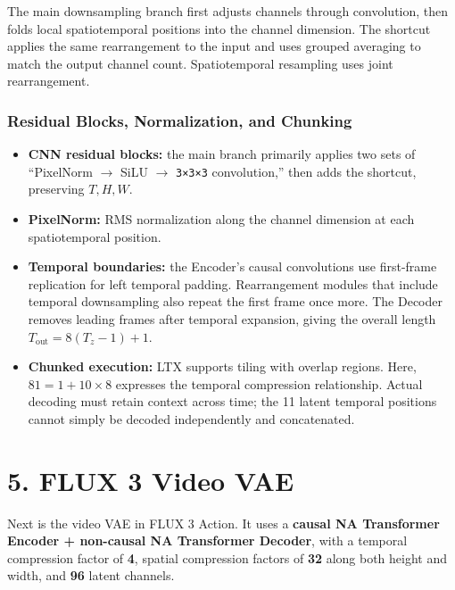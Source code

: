 \documentclass[
  11pt,
  a4paper,
]{article}
\providecommand{\tightlist}{%
  \setlength{\itemsep}{0pt}\setlength{\parskip}{0pt}}
\newcommand{\NotesFluxLayout}{%
  \clearpage
  \fancyhead[L]{\small\sffamily\color{notesgray}Video VAE / FLUX 3 Details}%
  \linespread{1.06}\selectfont
  \setlength{\parskip}{0.24em}%
  \setlength{\abovedisplayskip}{6pt plus 2pt minus 2pt}%
  \setlength{\belowdisplayskip}{6pt plus 2pt minus 2pt}%
  \setlength{\abovedisplayshortskip}{3pt plus 2pt}%
  \setlength{\belowdisplayshortskip}{3pt plus 2pt minus 2pt}%
}
\begin{document}
\endgroup

The main downsampling branch first adjusts channels through convolution,
then folds local spatiotemporal positions into the channel dimension.
The shortcut applies the same rearrangement to the input and uses
grouped averaging to match the output channel count. Spatiotemporal
resampling uses joint rearrangement.


\subsubsection{Residual Blocks, Normalization, and
Chunking}\label{residual-blocks-normalization-and-chunking}

\begin{itemize}
\tightlist
\item
  \textbf{CNN residual blocks:} the main branch primarily applies two
  sets of ``PixelNorm \(\rightarrow\) SiLU \(\rightarrow\)
  \texttt{3×3×3} convolution,'' then adds the shortcut, preserving
  \(T,H,W\).
\item
  \textbf{PixelNorm:} RMS normalization along the channel dimension at
  each spatiotemporal position.
\item
  \textbf{Temporal boundaries:} the Encoder's causal convolutions use
  first-frame replication for left temporal padding. Rearrangement
  modules that include temporal downsampling also repeat the first frame
  once more. The Decoder removes leading frames after temporal
  expansion, giving the overall length
  \textbf{\(T_{\mathrm{out}}=8(T_z-1)+1\)}.
\item
  \textbf{Chunked execution:} LTX supports tiling with overlap regions.
  Here, \textbf{\(81=1+10\times8\)} expresses the temporal compression
  relationship. Actual decoding must retain context across time; the 11
  latent temporal positions cannot simply be decoded independently and
  concatenated.
\end{itemize}

\NotesFluxLayout

\section{5. FLUX 3 Video VAE}\label{flux3}

Next is the video VAE in FLUX 3 Action. It uses a \textbf{causal NA
Transformer Encoder + non-causal NA Transformer Decoder}, with a
temporal compression factor of \textbf{4}, spatial compression factors
of \textbf{32} along both height and width, and \textbf{96} latent
channels.
\end{document}

